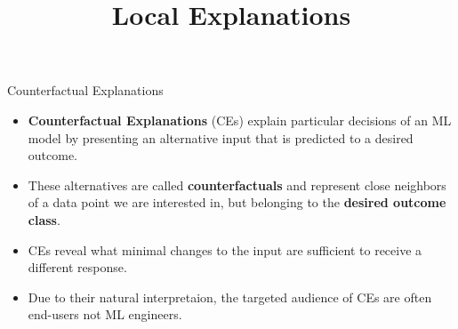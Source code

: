 \documentclass[11pt,compress,t,notes=noshow, xcolor=table]{beamer}
\title{Local Explanations}
\institute{\href{https://compstat-lmu.github.io/lecture_i2ml/}{compstat-lmu.github.io/lecture\_i2ml}}
\date{}
\begin{document}
	









\begin{vbframe}{Counterfactual Explanations}
	\begin{itemize}
	    \item \textbf{Counterfactual Explanations} (CEs) explain particular decisions of an ML model by presenting an alternative input that is predicted to a desired outcome.
		\item These alternatives are called \textbf{counterfactuals} and represent close neighbors of a data point we are interested in, but belonging to the \textbf{desired outcome class}. 
		\item CEs reveal what minimal changes to the input are sufficient to receive a different response.
		\item Due to their natural interpretaion, the targeted audience of CEs are often end-users not ML engineers.
	\end{itemize}
\end{vbframe}
\end{document}
